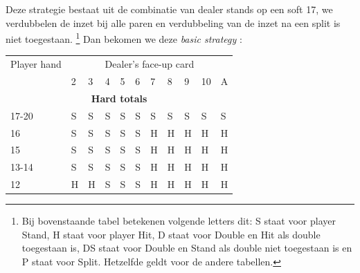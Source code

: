 \documentclass[conference]{IEEEtran}
\begin{document}
Deze strategie bestaat uit de combinatie van dealer stands op een soft 17, we verdubbelen de inzet bij alle paren en verdubbeling van de inzet na een split is niet toegestaan. \footnote{ Bij bovenstaande tabel betekenen volgende letters dit: S staat voor player Stand, H staat voor player Hit, D staat voor Double en Hit als double toegestaan is, DS staat voor Double en Stand als double niet toegestaan is en P staat voor Split. Hetzelfde geldt voor de andere tabellen.}
Dan bekomen we deze \textit{basic strategy} :

\begin{table}[ht]
\tiny
\centering
\begin{tabular}{|l|l|l|l|l|l|l|l|l|l|l|}
\hline

{Player hand} & \multicolumn{10}{c|}{Dealer's face-up card}     \\ \cline{2-11} 
                             & 2 & 3 & 4 & 5 & 6 & 7 & 8 & 9 & 10 & A \\ \hline \hline
\multicolumn{11}{|c|}{\textbf{Hard totals}}                           \\ \hline
17-20       								 & \cellcolor{red!75}S & \cellcolor{red!75}S & \cellcolor{red!75}S & \cellcolor{red!75}S & \cellcolor{red!75}S & \cellcolor{red!75}S & \cellcolor{red!75}S & \cellcolor{red!75}S & \cellcolor{red!75}S & \cellcolor{red!75}S  \\ \hline
16                           & \cellcolor{red!75}S & \cellcolor{red!75}S & \cellcolor{red!75}S & \cellcolor{red!75}S & \cellcolor{red!75}S & \cellcolor{green!50}H & \cellcolor{green!50}H & \cellcolor{green!50}H & \cellcolor{green!50}H & \cellcolor{green!50}H  \\ \hline
15                           & \cellcolor{red!75}S & \cellcolor{red!75}S & \cellcolor{red!75}S & \cellcolor{red!75}S & \cellcolor{red!75}S & \cellcolor{green!50}H & \cellcolor{green!50}H & \cellcolor{green!50}H & \cellcolor{green!50}H & \cellcolor{green!50}H  \\ \hline
13-14                        & \cellcolor{red!75}S & \cellcolor{red!75}S & \cellcolor{red!75}S & \cellcolor{red!75}S & \cellcolor{red!75}S & \cellcolor{green!50}H & \cellcolor{green!50}H & \cellcolor{green!50}H & \cellcolor{green!50}H & \cellcolor{green!50}H  \\ \hline
12                           & \cellcolor{green!50}H & \cellcolor{green!50}H & \cellcolor{red!75}S & \cellcolor{red!75}S & \cellcolor{red!75}S & \cellcolor{green!50}H & \cellcolor{green!50}H & \cellcolor{green!50}H & \cellcolor{green!50}H & \cellcolor{green!50}H  \\ \hline

\end{tabular}
\end{table}
\end{document}

